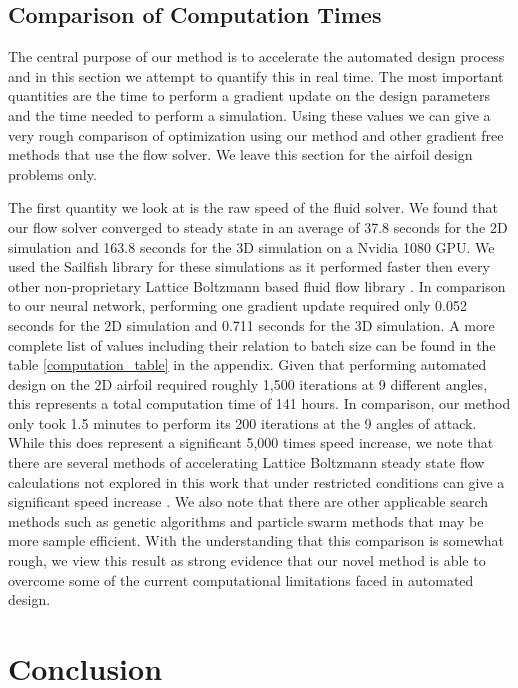 \documentclass{article} %
\begin{document}
\subsection{Comparison of Computation Times}

The central purpose of our method is to accelerate the automated design process and in this section we attempt to quantify this in real time. The most important quantities are the time to perform a gradient update on the design parameters and the time needed to perform a simulation. Using these values we can give a very rough comparison of optimization using our method and other gradient free methods that use the flow solver. We leave this section for the airfoil design problems only.

The first quantity we look at is the raw speed of the fluid solver. We found that our flow solver converged to steady state in an average of 37.8 seconds for the 2D simulation and 163.8 seconds for the 3D simulation on a Nvidia 1080 GPU. We used the Sailfish library for these simulations as it performed faster then every other non-proprietary Lattice Boltzmann based fluid flow library \citep{januszewski2014sailfish}. In comparison to our neural network, performing one gradient update required only 0.052 seconds for the 2D simulation and 0.711 seconds for the 3D simulation. A more complete list of values including their relation to batch size can be found in the table \ref{computation_table} in the appendix. Given that performing automated design on the 2D airfoil required roughly 1,500 iterations at 9 different angles, this represents a total computation time of 141 hours. In comparison, our method only took 1.5 minutes to perform its 200 iterations at the 9 angles of attack. While this does represent a significant 5,000 times speed increase, we note that there are several methods of accelerating Lattice Boltzmann steady state flow calculations not explored in this work that under restricted conditions can give a significant speed increase \citep{guo2013lattice} \citep{bernaschi2002computing}. We also note that there are other applicable search methods such as genetic algorithms and particle swarm methods that may be more sample efficient. With the understanding that this comparison is somewhat rough, we view this result as strong evidence that our novel method is able to overcome some of the current computational limitations faced in automated design.

\section{Conclusion}
\end{document}
